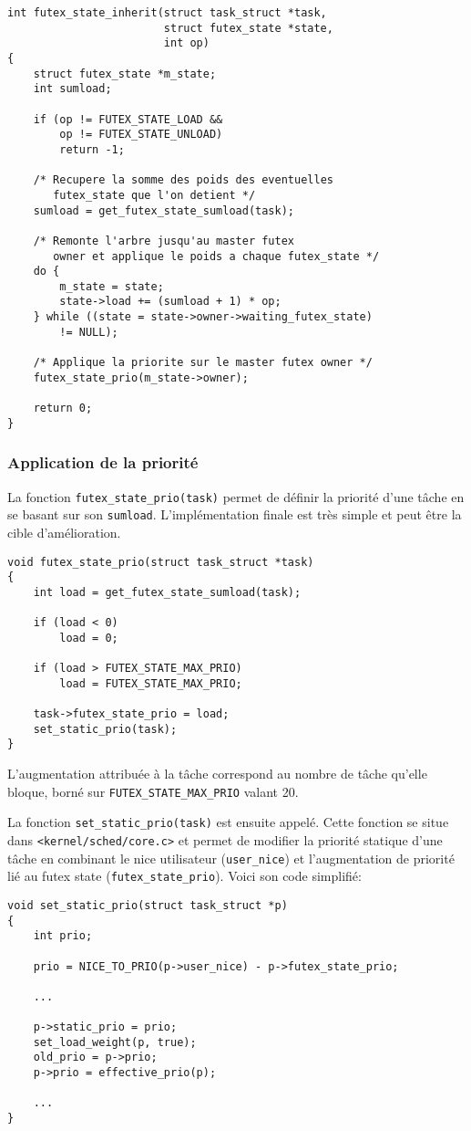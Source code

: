 \begin{lstlisting}[tabsize=4]
int futex_state_inherit(struct task_struct *task, 
						struct futex_state *state,
						int op)
{
	struct futex_state *m_state;
	int sumload;
	
	if (op != FUTEX_STATE_LOAD && 
		op != FUTEX_STATE_UNLOAD)
		return -1;
	
	/* Recupere la somme des poids des eventuelles 
 	   futex_state que l'on detient */
	sumload = get_futex_state_sumload(task);
	
	/* Remonte l'arbre jusqu'au master futex 
 	   owner et applique le poids a chaque futex_state */
	do {
		m_state = state;
		state->load += (sumload + 1) * op;
	} while ((state = state->owner->waiting_futex_state)
		!= NULL);
	
	/* Applique la priorite sur le master futex owner */
	futex_state_prio(m_state->owner);
	
	return 0;
}
\end{lstlisting}

\subsubsection{Application de la priorité}

La fonction \verb|futex_state_prio(task)| permet de définir la priorité d'une tâche en se
basant sur son \verb|sumload|. L'implémentation finale est très simple et peut être la cible
d'amélioration. 
\begin{lstlisting}[tabsize=4]
void futex_state_prio(struct task_struct *task)
{
	int load = get_futex_state_sumload(task);
	
	if (load < 0)
		load = 0;
	
	if (load > FUTEX_STATE_MAX_PRIO)
		load = FUTEX_STATE_MAX_PRIO;
	
	task->futex_state_prio = load;
	set_static_prio(task);
}
\end{lstlisting}

L'augmentation attribuée à la tâche correspond au nombre de tâche qu'elle bloque, borné sur 
\verb|FUTEX_STATE_MAX_PRIO| valant 20.

La fonction \verb|set_static_prio(task)| est ensuite appelé.
Cette fonction se situe dans \verb|<kernel/sched/core.c>| et permet de modifier la priorité
statique d'une tâche en combinant le nice utilisateur (\verb|user_nice|) et l'augmentation
de priorité lié au futex state (\verb|futex_state_prio|).
Voici son code simplifié:

\begin{lstlisting}[tabsize=4]
void set_static_prio(struct task_struct *p)
{
	int prio;
	
	prio = NICE_TO_PRIO(p->user_nice) - p->futex_state_prio;
	
	...
	
	p->static_prio = prio;
	set_load_weight(p, true);
	old_prio = p->prio;
	p->prio = effective_prio(p);
	
	...
}
\end{lstlisting}

